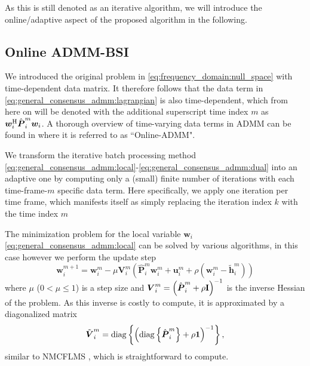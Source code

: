 \documentclass{article}
\newcommand{\hf}{{\bm{h}}}
\newcommand{\wf}{{\bm{w}}}
\newcommand{\uuf}{{\bm{u}}}
\newcommand{\aRhof}{{\bm{{P}}}}
\newcommand{\I}{\mtxb{I}}
\begin{document}
As this is still denoted as an iterative algorithm, we will introduce the online/adaptive aspect of the proposed algorithm in the following.

\subsection{Online ADMM-BSI}
\label{ssec:online_admm}
We introduced the original problem in \eqref{eq:frequency_domain:null_space} with time-dependent data matrix. It therefore follows that the data term in \eqref{eq:general_consensus_admm:lagrangian} is also time-dependent, which from here on will be denoted with the additional superscript time index \(m\) as \(\wf_i^\herm \hat{\aRhof}_i^{m} \wf_i\).
A thorough overview of time-varying data terms in ADMM can be found in \cite{wangOnlineAlternatingDirection2013,hosseiniOnlineDistributedADMM2014} where it is referred to as ``Online-ADMM".

We transform the iterative batch processing method \eqref{eq:general_consensus_admm:local}-\eqref{eq:general_consensus_admm:dual} into an adaptive one by computing only a (small) finite number of iterations with each time-frame-\(m\) specific data term.
Here specifically, we apply one iteration per time frame, which manifests itself as simply replacing the iteration index \(k\) with the time index \(m\)

The minimization problem for the local variable \(\wf_i\) \eqref{eq:general_consensus_admm:local} can be solved by various algorithms, in this case however we perform the update step
\begin{equation}
    \wf_i^{m+1} = \wf_i^{m} - \mu \bm{{V}}_i^m \left( \hat{\aRhof}_i^m \wf_i^m + \uuf_i^m + \rho\left(\wf_i^m - \tilde{\hf}_i^{m}\right)\right)\label{eq:online_admm:local_update}
\end{equation}
where \(\mu\) (\(0  < \mu\leq 1\)) is a step size and \(\bm{{V}}_i^m = \left(\hat{\aRhof}_i^m + \rho \I \right)^{-1}\) is the inverse Hessian of the problem.
As this inverse is costly to compute, it is approximated by a diagonalized matrix
\begin{equation}
    \tilde{\bm{{V}}}_i^m = \operatorname{diag} \left\{ \left( \operatorname{diag} \left\{ \hat{\aRhof}_i^m \right\} + \rho \mtxb{1} \right)^{-1}\right\},
\end{equation}
similar to NMCFLMS \cite{huangClassFrequencydomainAdaptive2003}, which is straightforward to compute.
\end{document}
